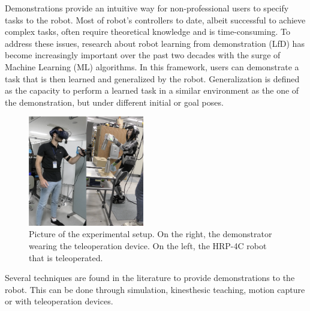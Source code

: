 \documentclass[conference]{IEEEtran}
\begin{document}
Demonstrations provide an intuitive way for non-professional users to specify tasks to the robot\cite{schaal_is_1999}. Most of robot's controllers to date, albeit successful to achieve complex tasks, often require theoretical knowledge and is time-consuming. To address these issues, research about robot learning from demonstration (LfD) has become increasingly important over the past two decades with the surge of Machine Learning (ML) algorithms\cite{argall_survey_2009,ravichandar_recent_2020}. In this framework, users can demonstrate a task that is then learned and generalized by the robot. Generalization is defined as the capacity to perform a learned task in a similar environment as the one of the demonstration, but under different initial or goal poses. 


\begin{figure}[t]
  \centering
  \includegraphics[width=0.45\textwidth]{img/Setup.png}
  \caption{Picture of the experimental setup. On the right, the demonstrator wearing the teleoperation device. On the left, the HRP-4C robot that is teleoperated.}
  \label{fig:setup}
\end{figure}


Several techniques are found in the literature to provide demonstrations to the robot. This can be done through simulation\cite{sammut_learning_1992}, kinesthesic teaching\cite{wu_prim-lafd:_2022}, motion capture\cite{ramirez-amaro_understanding_2015} or with teleoperation devices. 
\end{document}
